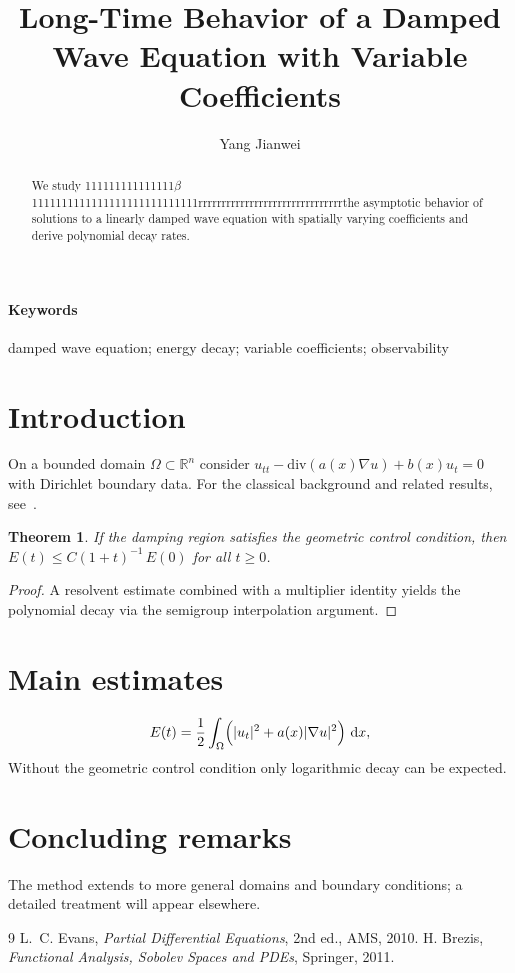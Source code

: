 \documentclass{aimsart}
\title{Long-Time Behavior of a Damped Wave Equation with Variable Coefficients}
\author{Yang Jianwei}
\date{}
\def\YTfallback{1}
\newtheorem{theorem}{Theorem}[section]
\newcommand{\R}{\mathbb{R}}
\newcommand{\Om}{\Omega}
\newcommand{\dd}{\,\mathrm{d}}
\begin{document}
\maketitle
\ifdefined\YTfallback
\noindent{}
\bigskip
\fi
\begin{abstract}
We study 111111111111111$\beta$ 1111111111111111111111111111rrrrrrrrrrrrrrrrrrrrrrrrrrrrrrrthe asymptotic behavior of solutions to a linearly damped wave equation with spatially varying coefficients and derive polynomial decay rates.
\end{abstract}
\paragraph{Keywords} damped wave equation; energy decay; variable coefficients; observability

\section{Introduction}
On a bounded domain $\Om\subset\R^n$ consider $u_{tt}-\mathrm{div}(a(x)\nabla u)+b(x)u_t=0$ with Dirichlet boundary data.
For the classical background and related results, see~\cite{Evans,Brezis}.

\begin{theorem}
If the damping region satisfies the geometric control condition, then $E(t)\le C(1+t)^{-1}\,E(0)$ for all $t\ge0$.
\end{theorem}

\begin{proof}
A resolvent estimate combined with a multiplier identity yields the polynomial decay via the semigroup interpolation argument.
\end{proof}

\section{Main estimates}
\begin{equation}
E(t)=\frac12\int_\Om\Bigl(|u_t|^2+a(x)|\nabla u|^2\Bigr)\,\dd x,
\end{equation}
Without the geometric control condition only logarithmic decay can be expected.

\section{Concluding remarks}
The method extends to more general domains and boundary conditions; a detailed
treatment will appear elsewhere.

\begin{thebibliography}{9}
 L.~C. Evans, \emph{Partial Differential Equations}, 2nd ed., AMS, 2010.
 H. Brezis, \emph{Functional Analysis, Sobolev Spaces and PDEs}, Springer, 2011.
\end{thebibliography}
\end{document}
